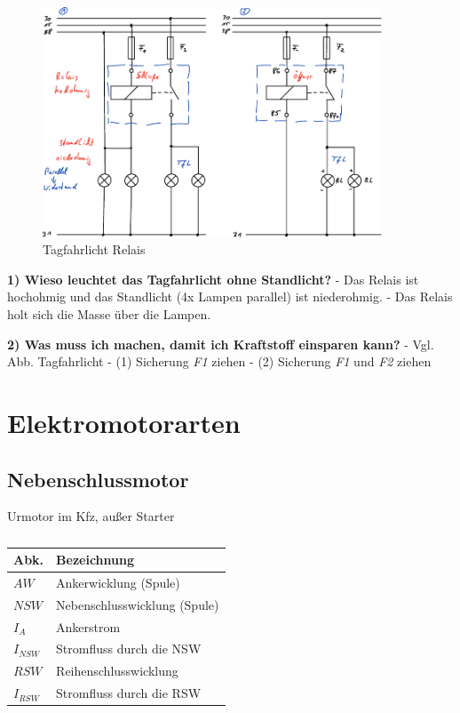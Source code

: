 \begin{figure}[!ht]%
\centering
\includegraphics[width=0.9\textwidth]{images/Skizze/29_FT_Tagfahrlicht_Relais.pdf}
\caption{Tagfahrlicht Relais}
\end{figure}

\textbf{1) Wieso leuchtet das Tagfahrlicht ohne Standlicht?} - Das
Relais ist hochohmig und das Standlicht (4x Lampen parallel) ist
niederohmig. - Das Relais holt sich die Masse über die Lampen.

\textbf{2) Was muss ich machen, damit ich Kraftstoff einsparen kann?} -
Vgl. Abb. Tagfahrlicht - (1) Sicherung \emph{F1} ziehen - (2) Sicherung
\emph{F1} und \emph{F2} ziehen

\newpage

\section{Elektromotorarten}\label{elektromotorarten}

\subsection{Nebenschlussmotor}\label{nebenschlussmotor}

Urmotor im Kfz, außer Starter

\begin{table}[!ht]%
\centering 
	\caption{}%
\begin{tabular}{@{}ll@{}}
\hline
\textbf{Abk.} & \textbf{Bezeichnung} \\
\hline
$AW$ & Ankerwicklung (Spule) \\
$NSW$ & Nebenschlusswicklung (Spule) \\
$I_A$ & Ankerstrom \\
$I_{NSW}$ & Stromfluss durch die NSW \\
$RSW$ & Reihenschlusswicklung \\
$I_{RSW}$ & Stromfluss durch die RSW \\
\hline
\end{tabular} 
\end{table}

